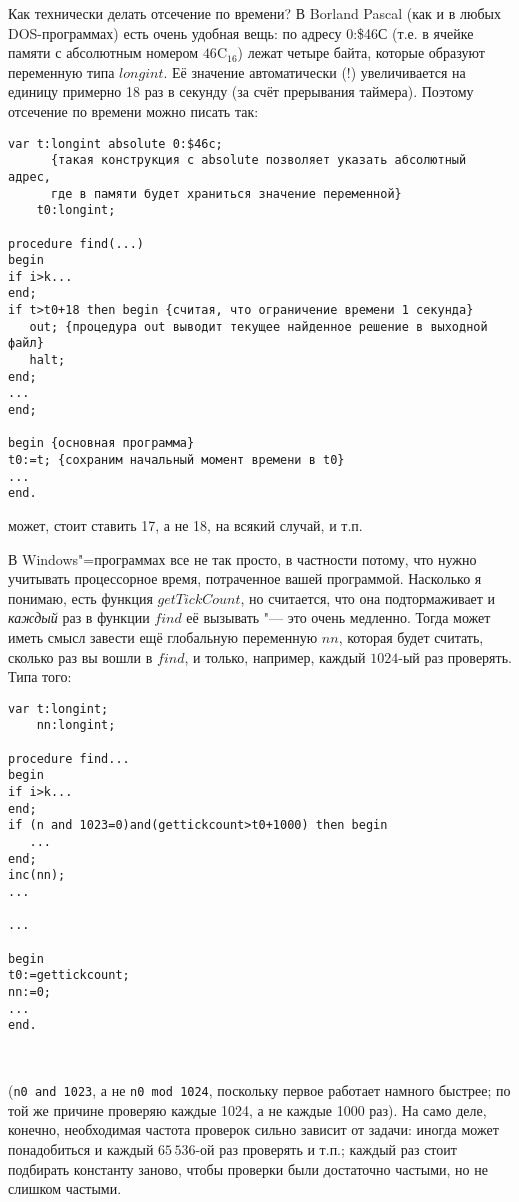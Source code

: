 Как технически делать отсечение по времени? В Borland Pascal (как и в 
любых DOS-программах) есть очень удобная вещь: по адресу 0:\$46С (т.е. в ячейке памяти с абсолютным номером $46\mathrm C_{16}$) лежат четыре 
байта, которые образуют переменную типа $longint$. Её значение автоматически (!)
увеличивается на единицу примерно 18 раз в секунду (за счёт прерывания 
таймера). Поэтому отсечение по времени можно писать так:
\begin{codesampleo}\begin{verbatim}
var t:longint absolute 0:$46c; 
      {такая конструкция с absolute позволяет указать абсолютный адрес, 
      где в памяти будет храниться значение переменной}
    t0:longint;
    
procedure find(...)
begin
if i>k...
end;
if t>t0+18 then begin {считая, что ограничение времени 1 секунда}
   out; {процедура out выводит текущее найденное решение в выходной файл}
   halt;
end;
...
end;

begin {основная программа}
t0:=t; {сохраним начальный момент времени в t0}
...
end.
\end{verbatim}\end{codesampleo}
может, стоит ставить 17, а не 18, на всякий случай, и т.п.

В Windows"=программах все не так просто, в частности потому, что нужно учитывать 
процессорное время, потраченное вашей программой. Насколько я понимаю, есть 
функция $getTickCount$, но считается, что она подтормаживает и \textit{каждый} раз 
в функции $find$ её вызывать "--- это очень медленно. Тогда может иметь смысл 
завести ещё глобальную переменную $nn$, которая будет считать, сколько раз вы 
вошли в $find$, и только, например, каждый $1024$-ый раз проверять. Типа того:

\begin{codesample}\begin{verbatim}
var t:longint;
    nn:longint;
    
procedure find...
begin
if i>k...
end;
if (n and 1023=0)and(gettickcount>t0+1000) then begin
   ...
end;
inc(nn);
...

...

begin
t0:=gettickcount;
nn:=0;
...
end.



\end{verbatim}\end{codesample}

(\texttt{n0 and 1023}, а не \texttt{n0 mod 1024}, поскольку первое работает намного быстрее; по той же причине проверяю каждые 1024, а не каждые 1000 раз). На само деле, конечно, необходимая частота проверок сильно зависит от задачи: иногда может понадобиться и каждый $65\,536$-ой раз проверять и т.п.; каждый раз стоит подбирать константу заново, чтобы проверки были достаточно частыми, но не слишком частыми.
 
